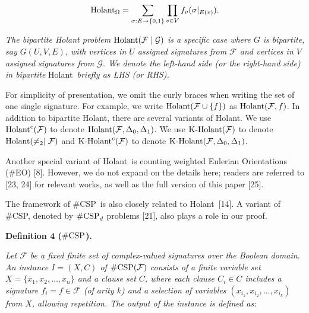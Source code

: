 \[\begin{gathered}
\textup{{Holant}}_{\Omega}=\sum_{\sigma:E\rightarrow\{0,1\}}\prod_{v\in V}f_{v}(\sigma|_{E(v)}).
\end{gathered}\]


\emph{The bipartite Holant problem $\textup{{Holant}}(\mathcal{F}\mid\mathcal{G})$ is a specific case where $G$ is bipartite, say $G(U,V,E)$, with vertices in $U$ assigned signatures from $\mathcal{F}$ and vertices in $V$ assigned signatures from $\mathcal{G}$. We denote the left-hand side (or the right-hand side) in bipartite }Holant\emph{ briefly as LHS (or RHS).}\par






For simplicity of presentation, we omit the curly braces when writing the set of one single signature. For example, we write $\textup{{Holant}}(\mathcal{F}\cup\{f\})$ as $\textup{{Holant}}(\mathcal{F},f)$. In addition to bipartite Holant, there are several variants of Holant. We use $\textup{{Holant}}^{c}(\mathcal{F})$ to denote $\textup{{Holant}}(\mathcal{F},\Delta_{0},\Delta_{1})$. We use $\textup{{K-Holant}}(\mathcal{F})$ to denote $\textup{{Holant}}(\neq_{2}\mid\mathcal{F})$ and $\textup{{K-Holant}}^{c}(\mathcal{F})$ to denote $\textup{{K-Holant}}(\mathcal{F},\Delta_{0},\Delta_{1})$.\par




Another special variant of Holant is counting weighted Eulerian Orientations (\#EO) [8]. However, we do not expand on the details here; readers are referred to [23, 24] for relevant works, as well as the full version of this paper [25].\par




The framework of \#CSP is also closely related to Holant [14]. A variant of \#CSP, denoted by $\textup{{\#CSP}}_{d}$ problems [21], also plays a role in our proof.\par





\par\medskip\noindent\textbf{
\textbf{Definition 4}\textbf{ }($\#\textup{{CSP}}$)\textbf{.}
}\par



\emph{Let $\mathcal{F}$ be a fixed finite set of complex-valued signatures over the Boolean domain. An instance $I=(X,C)$ of $\#\textup{{CSP}}(\mathcal{F})$ consists of a finite variable set $X=\{x_{1},x_{2},\ldots,x_{n}\}$ and a clause set $C$, where each clause $C_{i}\in C$ includes a signature $f_{i}=f\in\mathcal{F}$ (of arity $k$) and a selection of variables $(x_{i_{1}},x_{i_{2}},\ldots,x_{i_{k}})$ from $X$, allowing repetition. The output of the instance is defined as:}\par


